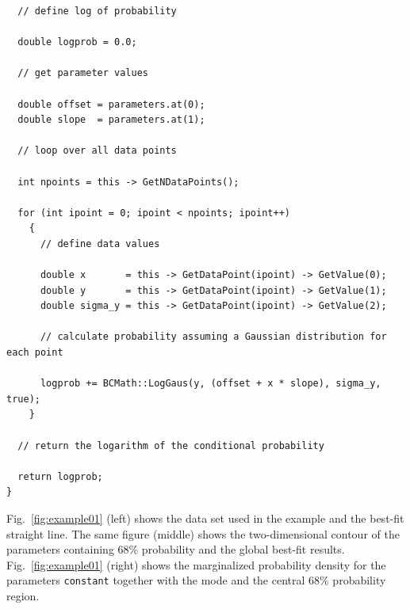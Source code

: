 \documentclass[11pt, a4paper]{article}
\begin{document}
\begin{small}
\begin{verbatim}
  // define log of probability

  double logprob = 0.0;

  // get parameter values

  double offset = parameters.at(0);
  double slope  = parameters.at(1);

  // loop over all data points

  int npoints = this -> GetNDataPoints();

  for (int ipoint = 0; ipoint < npoints; ipoint++)
    {
      // define data values

      double x       = this -> GetDataPoint(ipoint) -> GetValue(0);
      double y       = this -> GetDataPoint(ipoint) -> GetValue(1);
      double sigma_y = this -> GetDataPoint(ipoint) -> GetValue(2);

      // calculate probability assuming a Gaussian distribution for each point
 
      logprob += BCMath::LogGaus(y, (offset + x * slope), sigma_y, true);
    }

  // return the logarithm of the conditional probability 

  return logprob; 
}
\end{verbatim} 
\end{small} 

\noindent 
Fig.~\ref{fig:example01} (left) shows the data set used in the example
and the best-fit straight line. The same figure (middle) shows the
two-dimensional contour of the parameters containing 68\% probability
and the global best-fit results. Fig.~\ref{fig:example01} (right)
shows the marginalized probability density for the parameters
\verb|constant| together with the mode and the central 68\%
probability region.
\end{document}
